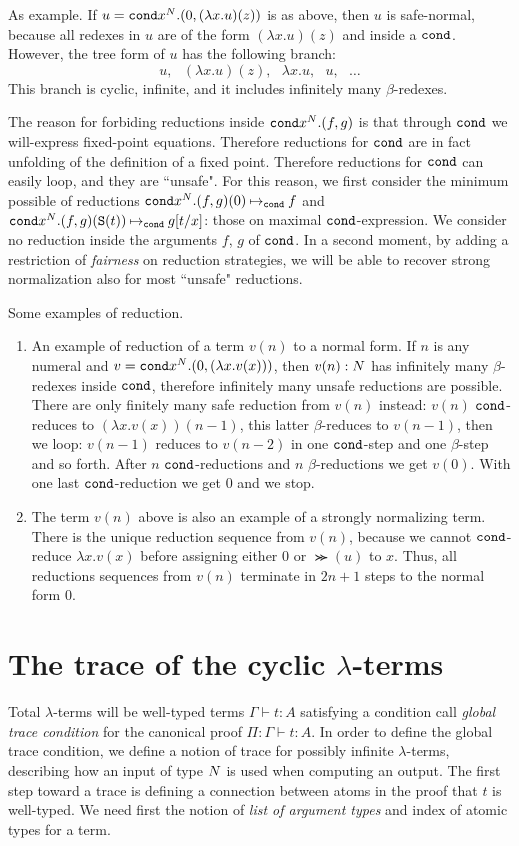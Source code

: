 \documentclass{article}
\begin{document}
As example. If $u = {\tt cond} x^{N}. (0, (\lambda x.u)(z) )$ is as above, then $u$ is safe-normal, because
all redexes in $u$ are of the form  $(\lambda x.u)(z)$ and inside a ${\tt cond}$. 
However, the tree form of $u$ has the following branch:
$$
u, \ \ \ 
(\lambda x.u)(z), \ \ \ 
\lambda x.u, \ \ \ 
u, \ \ \ \ldots
$$
This branch is cyclic, infinite,
and it includes infinitely many $\beta$-redexes.

The reason for forbiding
reductions inside ${\tt cond} x^{N}.(f,g)$ is that through ${\tt cond}$ we will-express fixed-point equations.
Therefore reductions for ${\tt cond}$ are in fact unfolding of the definition of a fixed point. 
Therefore reductions for ${\tt cond}$ can easily loop, and they are ``unsafe". 
For this reason, we first consider the minimum possible of reductions
${\tt cond} x^{N}.(f,g)(0) \mathbin{\mapsto}_{\tt cond} f$ and
${\tt cond} x^{N}.(f,g)({\tt S} (t)) \mathbin{\mapsto}_{\tt cond} g[t/x]$: those on maximal ${\tt cond}$-expression.
We consider no reduction inside the arguments $f$, $g$ of ${\tt cond}$.
In a second moment, 
by adding a restriction of \emph{fairness} on reduction strategies,
we will be able to recover strong normalization also for most ``unsafe" reductions.

Some examples of reduction.
\begin{enumerate}
\item
An example of reduction of a term $v(n)$ to a normal form. 
If $n$ is any numeral and $v = {\tt cond} x^{N}. (0, (\lambda x.v(x)) )$, then 
$v(n): {N}$ has infinitely many $\beta$-redexes inside 
${\tt cond}$, therefore infinitely many unsafe reductions are possible. There are only finitely many safe reduction
from $v(n)$ instead: $v(n)$ ${\tt cond}$-reduces to $(\lambda x.v(x))(n-1)$, 
this latter $\beta$-reduces to $v(n-1)$, 
then we loop: $v(n-1)$ reduces to $v(n-2)$ in one ${\tt cond}$-step and one $\beta$-step and so forth.
After $n$ ${\tt cond}$-reductions and 
$n$ $\beta$-reductions we get $v(0)$. With one last ${\tt cond}$-reduction we get $0$ and we stop. 
\item
The term $v(n)$ above is also an example of a strongly normalizing term.
There is the unique reduction sequence from $v(n)$, because we cannot ${\tt cond}$-reduce $\lambda x.v(x)$
before assigning either $0$ or $\Succ(u)$ to $x$. 
Thus, all reductions sequences from $v(n)$ terminate in $2n+1$ steps to the normal form $0$.
\end{enumerate}


\section{The trace of the cyclic $\lambda$-terms}
Total $\lambda$-terms will be well-typed terms $\Gamma \vdash t:A$ 
satisfying a condition call \emph{global trace condition} for the canonical proof 
$\Pi:\Gamma \vdash t:A$.
In order to define the global trace condition, 
we define a notion of trace for possibly infinite $\lambda$-terms, describing how an input of type ${N}$
is used when computing an output.
The first step toward a trace is defining a connection between atoms in the
proof that $t$ is well-typed. We need first the notion of \emph{list of argument
 types} and index of atomic types for a term.
\end{document}
